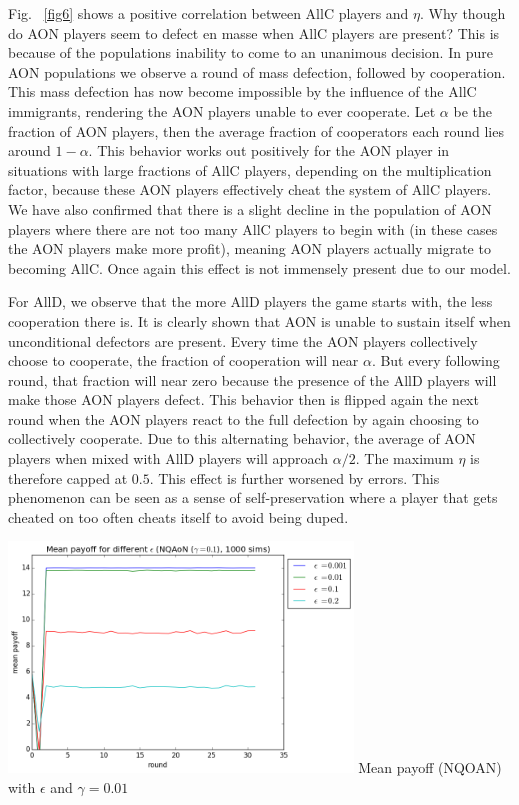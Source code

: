 \documentclass[letterpaper]{article}
\begin{document}
Fig. ~\ref{fig6} shows a positive correlation between AllC players and $\eta$. Why though do AON players seem to defect en masse when AllC players are present? This is because of the population\textquotesingle s inability to come to an unanimous decision. In pure AON populations we observe a round of mass defection, followed by cooperation. This mass defection has now become impossible by the influence of the AllC immigrants, rendering the AON players unable to ever cooperate. Let $\alpha$ be the fraction of AON players, then the average fraction of cooperators each round lies around $1-\alpha$. This behavior works out positively for the AON player in situations with large fractions of AllC players, depending on the multiplication factor, because these AON players effectively cheat the system of AllC players. We have also confirmed that there is a slight decline in the population of AON players where there are not too many AllC players to begin with (in these cases the AON players make more profit), meaning AON players actually migrate to becoming AllC. Once again this effect is not immensely present due to our model.

For AllD, we observe that the more AllD players the game starts with, the less cooperation there is. It is clearly shown that AON is unable to sustain itself when unconditional defectors are present. Every time the AON players collectively choose to cooperate, the fraction of cooperation will near $\alpha$. But every following round, that fraction will near zero because the presence of the AllD players will make those AON players defect. This behavior then is flipped again the next round when the AON players react to the full defection by again choosing to collectively cooperate. Due to this alternating behavior, the average of AON players when mixed with AllD players will approach $\alpha/2$. The maximum $\eta$ is therefore capped at $0.5$. This effect is further worsened by errors. This phenomenon can be seen as a sense of self-preservation where a player that gets cheated on too often cheats itself to avoid being duped.


\vspace{5 mm}
\includegraphics[width=3.6in,angle=0]{img/meanpayoff_epsilon_nqaongamma01.png}
 {Mean payoff (NQOAN) with $\epsilon$ and $\gamma=0.01$}
\label{fig8}
\vspace{5 mm}
\end{document}
